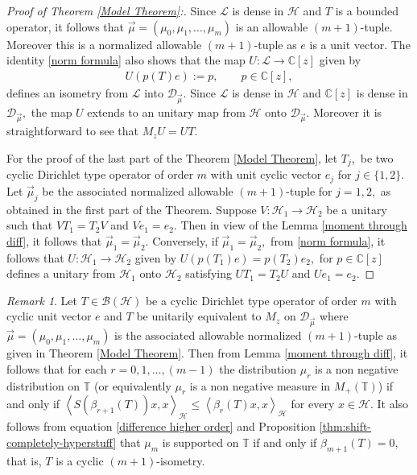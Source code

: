 \documentclass[10pt,oneside,reqno]{amsart}
\theoremstyle{definition}
\theoremstyle{remark}
\newtheorem{remark}[theorem]{Remark}
\newcommand{\calH}{{\mathcal{H}}}
\newcommand{\ip}[1]{\left\langle #1 \right\rangle}
\newcommand{\T}{\mathbb T}
\numberwithin{equation}{section}
\begin{document}
\begin{proof}[Proof of Theorem \ref{Model Theorem}:]
  Since $\mathcal L$ is dense in $\mathcal H$ and $T$ is a bounded operator, it follows that   $\overrightarrow{\mu} = \left( \mu_{0}, \mu_{1}, \ldots , \mu_{m} \right)$ is an allowable $(m+1)$-tuple. Moreover this is a normalized allowable $(m+1)$-tuple as $e$ is a unit vector. The identity \eqref{norm formula} also shows that the map $U: \mathcal L \to \mathbb C[z]$ given by 
  \begin{align*}
     U(p(T)e):= p,\qquad p\in\mathbb C[z],
  \end{align*} defines an isometry from $\mathcal L$ into $\mathscr D_{\overrightarrow{\mu}}.$ Since $\mathcal L$ is dense in $\mathcal H$ and $\mathbb C[z]$ is dense in $\mathscr D_{\overrightarrow{\mu}},$ the map $U$ extends to an unitary map from $\mathcal H$ onto $\mathscr D_{\overrightarrow{\mu}}.$ Moreover it is straightforward to see that $M_zU=UT.$

For the proof of the last part of the Theorem \ref{Model Theorem}, let $T_j,$  be two cyclic Dirichlet type operator of order $m$ with unit cyclic vector $e_j$ for $j\in\{1,2\}.$ Let  $\overrightarrow{\mu}_j$ be the associated normalized allowable $(m+1)$-tuple for $j=1,2,$ as obtained in the first part of the Theorem. Suppose $V:\mathcal H_1\to \mathcal H_2$ be a unitary such that $VT_1=T_2V$ and $Ve_1=e_2.$ Then in view of the Lemma \ref{moment through diff}, it follows that $\overrightarrow{\mu}_1= \overrightarrow{\mu}_2.$ Conversely, if $\overrightarrow{\mu}_1= \overrightarrow{\mu}_2,$ from \eqref{norm formula}, it follows that $U:\mathcal H_1 \to \mathcal H_2$ given by $U(p(T_1)e)=p(T_2)e_2,$ for $p\in\mathbb C[z]$ defines a unitary from $\calH_1$ onto $\calH_2$ satisfying $UT_1=T_2U$ and $Ue_1=e_2.$
\end{proof}

\begin{remark}\label{positivity of measure}
Let $T\in \mathcal B(\mathcal H)$ be a cyclic Dirichlet type operator of order $m$ with cyclic unit vector $e$ and $T$ be unitarily equivalent to $M_z$ on $\mathscr D_{\overrightarrow{\mu}}$ where $\overrightarrow{\mu}=(\mu_0,\mu_1,\ldots,\mu_m)$ is the associated allowable normalized $(m+1)$-tuple as given in Theorem \ref{Model Theorem}. Then from Lemma \ref{moment through diff}, it follows that for each $r=0,1,\ldots,(m-1)$ the distribution $\mu_r$ is a non negative distribution on $\T$ (or equivalently $\mu_r$ is a non negative measure in $M_+(\mathbb T)$) if and only if $\ip{S(\beta_{r+1}(T))x,x}_{\calH}\leqslant \ip{\beta_r(T)x,x}_{\calH}$ for every $x\in \mathcal H.$ It also follows from equation \eqref{difference higher order} and Proposition \ref{thm:shift-completely-hyperstuff} that $\mu_m$ is supported on $\mathbb T$ if and only if $\beta_{m+1}(T)=0,$ that is, $T$ is a cyclic $(m+1)$-isometry.
\end{remark}
\end{document}
